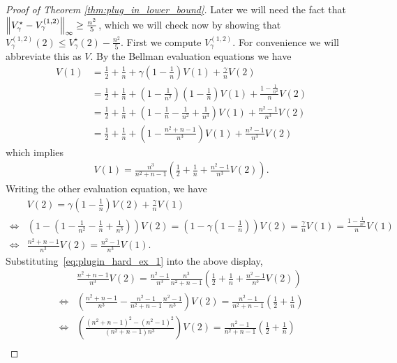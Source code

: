 \documentclass{article}
\theoremstyle{plain}
\theoremstyle{plain}
\theoremstyle{remark}
\theoremstyle{plain}
\theoremstyle{plain}
\begin{document}
\begin{proof}[Proof of Theorem \ref{thm:plug_in_lower_bound}]
Later we will need the fact that $\left\Vert V_\gamma^\star - V_\gamma^{(1,2)}\right\Vert _{\infty} \geq \frac{n^2}{5}$, which we will check now by showing that $V_\gamma^{(1,2)}(2) \leq V_\gamma^{\star}(2) - \frac{n^2}{5}$. First we compute $V_\gamma^{(1,2)}$. For convenience we will abbreviate this as $V$. By the Bellman evaluation equations we have
\begin{align*}
    V(1) &= \frac{1}{2} + \frac{1}{n} + \gamma \left(1-\frac{1}{n} \right) V(1) + \frac{\gamma}{n} V(2) \\
    &= \frac{1}{2} + \frac{1}{n} + \left(1-\frac{1}{n^2} \right) \left(1-\frac{1}{n} \right) V(1) + \frac{1-\frac{1}{n^2}}{n} V(2) \\
    &= \frac{1}{2} + \frac{1}{n} + \left(1 -\frac{1}{n}-\frac{1}{n^2} + \frac{1}{n^3} \right) V(1) + \frac{n^2 - 1}{n^3} V(2) \\
    &= \frac{1}{2} + \frac{1}{n} + \left(1 -\frac{n^2 + n - 1}{n^3} \right) V(1) + \frac{n^2 - 1}{n^3} V(2)
\end{align*}
which implies
\begin{align}
    V(1) = \frac{n^3}{n^2 + n - 1} \left(\frac{1}{2}+\frac{1}{n} + \frac{n^2 - 1}{n^3}V(2) \right). \label{eq:plugin_hard_ex_1}
\end{align}
Writing the other evaluation equation, we have
\begin{align*}
    & V(2) = \gamma \left(1 - \frac{1}{n} \right)V(2) + \frac{\gamma}{n} V(1) \\
    \iff & \left(1 - \left(1 - \frac{1}{n^2} - \frac{1}{n} + \frac{1}{n^3} \right) \right) V(2) =  \left(1 - \gamma \left(1 - \frac{1}{n} \right) \right) V(2) = \frac{\gamma}{n} V(1) = \frac{1 - \frac{1}{n^2}}{n} V(1) \\
    \iff & \frac{n^2 + n - 1}{n^3} V(2) = \frac{n^2 - 1}{n^3} V(1).
\end{align*}
Substituting~\eqref{eq:plugin_hard_ex_1} into the above display,
\begin{align*}
    &\frac{n^2 + n - 1}{n^3} V(2) = \frac{n^2 - 1}{n^3} \frac{n^3}{n^2 + n - 1} \left(\frac{1}{2}+\frac{1}{n} + \frac{n^2 - 1}{n^3}V(2) \right) \\
    \iff & \left(\frac{n^2 + n - 1}{n^3} - \frac{n^2 - 1}{n^2 + n - 1} \frac{n^2 - 1}{n^3}\right) V(2) = \frac{n^2 - 1}{n^2 + n - 1} \left( \frac{1}{2} + \frac{1}{n}\right) \\
    \iff & \left(\frac{(n^2 + n - 1)^2 - (n^2 - 1)^2}{(n^2 + n - 1)n^3}\right) V(2) = \frac{n^2 - 1}{n^2 + n - 1} \left( \frac{1}{2} + \frac{1}{n}\right) \\

\end{align*}
\end{proof}
\end{document}
